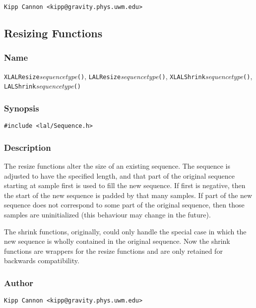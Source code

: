 \verb|Kipp Cannon <kipp@gravity.phys.uwm.edu>|


\subsection{Resizing Functions}

\subsubsection{Name}

\texttt{XLALResize}\textit{sequencetype}\texttt{()},
\texttt{LALResize}\textit{sequencetype}\texttt{()},
\texttt{XLALShrink}\textit{sequencetype}\texttt{()},
\texttt{LALShrink}\textit{sequencetype}\texttt{()}

\subsubsection{Synopsis}

\begin{verbatim}
#include <lal/Sequence.h>
\end{verbatim}


\subsubsection{Description}

The resize functions alter the size of an existing sequence.  The sequence
is adjusted to have the specified length, and that part of the original
sequence starting at sample first is used to fill the new sequence.  If
first is negative, then the start of the new sequence is padded by that
many samples.  If part of the new sequence does not correspond to some part
of the original sequence, then those samples are uninitialized (this
behaviour may change in the future).

The shrink functions, originally, could only handle the special case in
which the new sequence is wholly contained in the original sequence.  Now
the shrink functions are wrappers for the resize functions and are only
retained for backwards compatibility.

\subsubsection{Author}

\verb|Kipp Cannon <kipp@gravity.phys.uwm.edu>|
